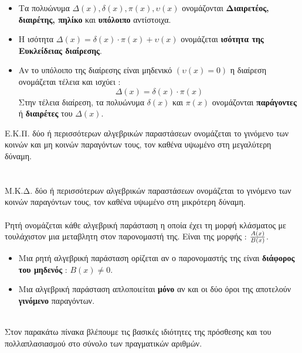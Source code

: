 \documentclass[twoside,nofonts,internet,shmeiwseis]{thewria}
\DeclareRobustCommand{\frac}[3][0pt]{%
{\begingroup\hspace{#1}#2\hspace{#1}\endgroup\over\hspace{#1}#3\hspace{#1}}}
\begin{document}
\begin{itemize}
\item Τα πολυώνυμα $ \varDelta(x),\delta(x),\pi(x),\upsilon(x) $ ονομάζονται \textbf{Διαιρετέος, διαιρέτης, πηλίκο} και \textbf{υπόλοιπο} αντίστοιχα.
\item Η ισότητα $ \varDelta(x)=\delta(x)\cdot\pi(x)+\upsilon(x) $ ονομάζεται \textbf{ισότητα της Ευκλείδειας διαίρεσης}.
\item Αν το υπόλοιπο της διαίρεσης είναι μηδενικό $ (\upsilon(x)=0) $ η διαίρεση ονομάζεται τέλεια και ισχύει :
\[ \varDelta(x)=\delta(x)\cdot\pi(x) \]
Στην τέλεια διαίρεση, τα πολυώνυμα $ \delta(x) $ και $ \pi(x) $ ονομάζονται \textbf{παράγοντες} ή \textbf{διαιρέτες} του $ \varDelta(x) $.
\end{itemize}
Ε.Κ.Π. δύο ή περισσότερων αλγεβρικών παραστάσεων ονομάζεται το γινόμενο των κοινών και μη κοινών παραγόντων τους, τον καθένα υψωμένο στη μεγαλύτερη δύναμη.\\\\\\
Μ.Κ.Δ. δύο ή περισσότερων αλγεβρικών παραστάσεων ονομάζεται το γινόμενο των κοινών παραγόντων τους, τον καθένα υψωμένο στη μικρότερη δύναμη.\\\\
Ρητή ονομάζεται κάθε αλγεβρική παράσταση η οποία έχει τη μορφή κλάσματος με τουλάχιστον μια μεταβλητη στον παρονομαστή της. Είναι της μορφής : $ \frac{A(x)}{B(x)} $.
\begin{itemize}[itemsep=0mm]
\item Μια ρητή αλγεβρική παράσταση ορίζεται αν ο παρονομαστής της είναι \textbf{διάφορος του μηδενός} : $ B(x)\neq0 $.
\item Μια αλγεβρική παράσταση απλοποιείται \textbf{μόνο} αν και οι δύο όροι της αποτελούν \textbf{γινόμενο} παραγόντων.
\end{itemize}\mbox{}\\
\thewrhmata
{}
Στον παρακάτω πίνακα βλέπουμε τις βασικές ιδιότητες της πρόσθεσης και του πολλαπλασιασμού στο σύνολο των πραγματικών αριθμών.
\end{document}
